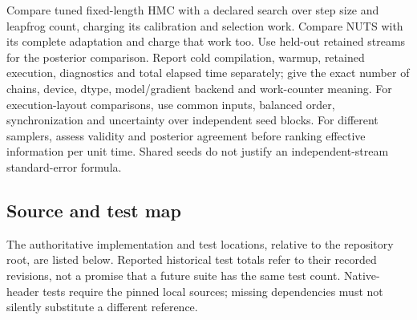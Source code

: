 Compare tuned fixed-length HMC with a declared search over step size and
leapfrog count, charging its calibration and selection work. Compare
NUTS with its complete adaptation and charge that work too. Use held-out
retained streams for the posterior comparison. Report cold compilation,
warmup, retained execution, diagnostics and total elapsed time separately;
give the exact number of chains, device, dtype, model/gradient backend and
work-counter meaning. For execution-layout comparisons, use common inputs,
balanced order, synchronization and uncertainty over independent seed blocks.
For different samplers, assess validity and posterior agreement before
ranking effective information per unit time. Shared seeds do not justify
an independent-stream standard-error formula.

\subsection{Source and test map}

The authoritative implementation and test locations, relative to the
repository root, are listed below. Reported historical test totals refer
to their recorded revisions, not a promise that a future suite has the
same test count. Native-header tests require the pinned local sources;
missing dependencies must not silently substitute a different reference.

